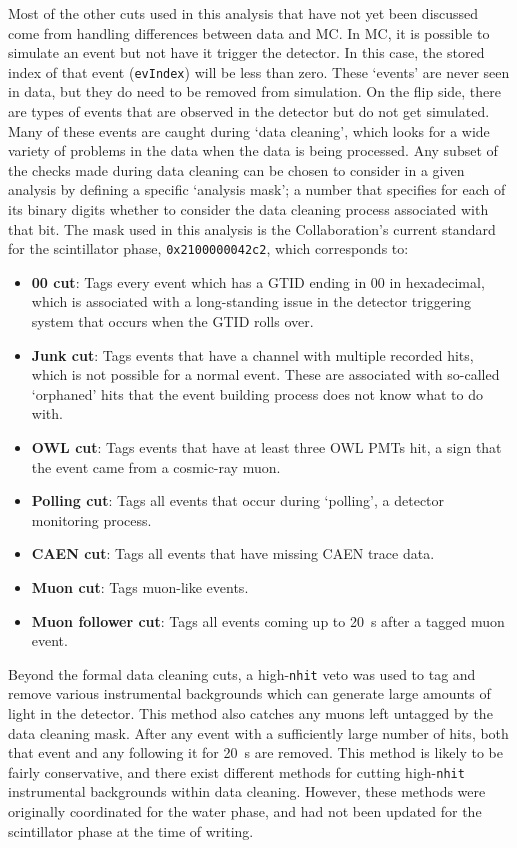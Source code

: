 Most of the other cuts used in this analysis that have not yet been discussed come from handling differences between data and MC. In MC, it is possible to simulate an event but not have it trigger the detector. In this case, the stored index of that event (\texttt{evIndex}) will be less than zero. These `events' are never seen in data, but they do need to be removed from simulation. On the flip side, there are types of events that are observed in the detector but do not get simulated. Many of these events are caught during `data cleaning', which looks for a wide variety of problems in the data when the data is being processed. Any subset of the checks made during data cleaning can be chosen to consider in a given analysis by defining a specific `analysis mask'; a number that specifies for each of its binary digits whether to consider the data cleaning process associated with that bit. The mask used in this analysis is the Collaboration's current standard for the scintillator phase, \texttt{0x2100000042c2}, which corresponds to:

\begin{itemize}
    \item \textbf{00 cut}: Tags every event which has a GTID ending in 00 in hexadecimal, which is associated with a long-standing issue in the detector triggering system that occurs when the GTID rolls over.
    \item \textbf{Junk cut}: Tags events that have a channel with multiple recorded hits, which is not possible for a normal event. These are associated with so-called `orphaned' hits that the event building process does not know what to do with.
    \item \textbf{OWL cut}: Tags events that have at least three OWL PMTs hit, a sign that the event came from a cosmic-ray muon.
    \item \textbf{Polling cut}: Tags all events that occur during `polling', a detector monitoring process.
    \item \textbf{CAEN cut}: Tags all events that have missing CAEN trace data.
    \item \textbf{Muon cut}: Tags muon-like events.
    \item \textbf{Muon follower cut}: Tags all events coming up to \SI{20}{\second} after a tagged muon event.
\end{itemize}

Beyond the formal data cleaning cuts, a high-\texttt{nhit} veto was used to tag and remove various instrumental backgrounds which can generate large amounts of light in the detector. This method also catches any muons left untagged by the data cleaning mask. After any event with a sufficiently large number of hits, both that event and any following it for \SI{20}{\second} are removed. This method is likely to be fairly conservative, and there exist different methods for cutting high-\texttt{nhit} instrumental backgrounds within data cleaning. However, these methods were originally coordinated for the water phase, and had not been updated for the scintillator phase at the time of writing.

